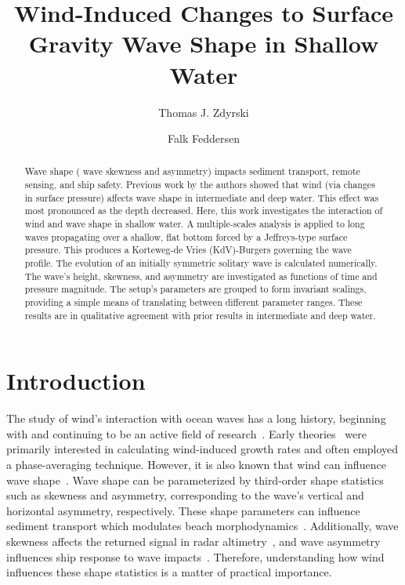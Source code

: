 \documentclass{jfm}
\title{Wind-Induced Changes to Surface Gravity Wave Shape in Shallow Water}
\author{Thomas J. Zdyrski \and Falk Feddersen}
\begin{document}
\maketitle

\begin{abstract}
Wave shape (\eg{} wave skewness and asymmetry) impacts sediment
transport, remote sensing, and ship safety.
Previous work by the authors showed that wind (via changes in surface
pressure) affects wave shape in intermediate and deep water.
This effect was most pronounced as the depth decreased.
Here, this work investigates the interaction of wind and wave shape in
shallow water.
A multiple-scales analysis is applied to long waves propagating over a
shallow, flat bottom forced by a Jeffreys-type surface pressure.
This produces a Korteweg-de Vries (KdV)-Burgers governing the wave
profile.
The evolution of an initially symmetric solitary wave is calculated
numerically.
The wave's height, skewness, and asymmetry are investigated as functions
of time and pressure magnitude.
The setup's parameters are grouped to form invariant scalings,
providing a simple means of translating between different parameter
ranges.
These results are in qualitative agreement with prior results in
intermediate and deep water.
\end{abstract}

\section{Introduction}

The study of wind's interaction with ocean waves has a long history, beginning
with \citet{jeffreys1925formation} and continuing to be an active field
of
research~\citep[\eg][]{banner1976separation,touboul2006interaction,tian2013evolution}.
Early
theories~\citep[\eg][]{jeffreys1925formation,miles1957generation,phillips1957generation}
were primarily interested in calculating wind-induced growth rates
and often employed a phase-averaging technique.
However, it is also known that wind can influence wave
shape~\citep[\eg][]{leykin1995asymmetry,feddersen2005wind,zdyrski2020wind}.
Wave shape can be parameterized by third-order shape statistics such as
skewness and asymmetry, corresponding to the wave's vertical and
horizontal asymmetry, respectively.
These shape parameters can influence sediment transport \citep[\eg][]{drake2001discrete,
gonzalez2007seabed} which modulates beach
morphodynamics~\citep[\eg][]{hoefel2003wave}.
Additionally, wave skewness affects the returned signal in radar
altimetry~\citep[\eg][]{hayne1980radar,huang1983non},
and wave asymmetry influences ship response to wave
impacts~\citep[\eg][]{soares2008abnormal,oberhagemann2013prediction}.
Therefore, understanding how wind influences these shape statistics is a
matter of practical importance.
\end{document}
